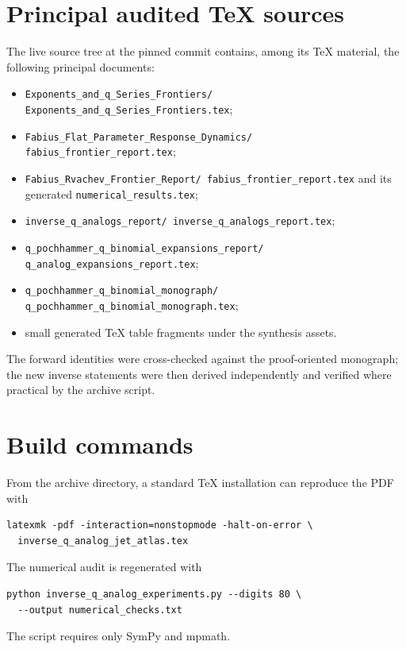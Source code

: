 \documentclass[11pt,letterpaper,oneside,openany]{book}
\theoremstyle{definition}
\theoremstyle{remark}
\begin{document}
\section{Principal audited TeX sources}
The live source tree at the pinned commit contains, among its TeX material, the
following principal documents:
\begin{itemize}
\item \texttt{Exponents\_and\_q\_Series\_Frontiers/
Exponents\_and\_q\_Series\_Frontiers.tex};
\item \texttt{Fabius\_Flat\_Parameter\_Response\_Dynamics/
fabius\_frontier\_report.tex};
\item \texttt{Fabius\_Rvachev\_Frontier\_Report/
fabius\_frontier\_report.tex} and its generated
\texttt{numerical\_results.tex};
\item \texttt{inverse\_q\_analogs\_report/
inverse\_q\_analogs\_report.tex};
\item \texttt{q\_pochhammer\_q\_binomial\_expansions\_report/
q\_analog\_expansions\_report.tex};
\item \texttt{q\_pochhammer\_q\_binomial\_monograph/
q\_pochhammer\_q\_binomial\_monograph.tex};
\item small generated TeX table fragments under the synthesis assets.
\end{itemize}
The forward identities were cross-checked against the proof-oriented monograph;
the new inverse statements were then derived independently and verified where
practical by the archive script.

\section{Build commands}
From the archive directory, a standard TeX installation can reproduce the PDF
with
\begin{lstlisting}[basicstyle=\ttfamily\small,frame=single]
latexmk -pdf -interaction=nonstopmode -halt-on-error \
  inverse_q_analog_jet_atlas.tex
\end{lstlisting}
The numerical audit is regenerated with
\begin{lstlisting}[style=pythonstyle]
python inverse_q_analog_experiments.py --digits 80 \
  --output numerical_checks.txt
\end{lstlisting}
The script requires only SymPy and mpmath.

\backmatter
\end{document}
